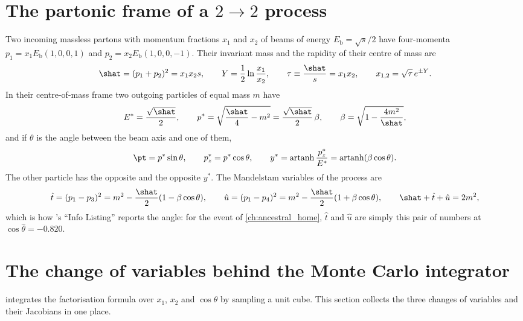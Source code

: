 \section{The partonic frame of a \texorpdfstring{$2\to2$}{2->2} process}
\label{app:kinematics:partonic}

Two incoming massless partons with momentum fractions $x_1$ and $x_2$ of
beams of energy $E_{\mathrm b}=\sqrt s/2$ have four-momenta
$p_1=x_1E_{\mathrm b}(1,0,0,1)$ and $p_2=x_2E_{\mathrm b}(1,0,0,-1)$. Their
invariant mass and the rapidity of their centre of mass are
\begin{equation}
  \shat=(p_1+p_2)^2=x_1x_2s,\qquad
  Y=\frac12\ln\frac{x_1}{x_2},\qquad
  \tau\equiv\frac{\shat}{s}=x_1x_2,\qquad
  x_{1,2}=\sqrt\tau\,e^{\pm Y}.
  \label{eq:app:tauY}
\end{equation}
In their centre-of-mass frame two outgoing particles of equal mass $m$ have
\begin{equation}
  E^{*}=\frac{\sqrt{\shat}}2,\qquad
  p^{*}=\sqrt{\frac{\shat}4-m^2}=\frac{\sqrt{\shat}}2\,\beta,\qquad
  \beta=\sqrt{1-\frac{4m^2}{\shat}},
  \label{eq:app:pstar}
\end{equation}
and if $\theta$ is the angle between the beam axis and one of them,
\begin{equation}
  \pt=p^{*}\sin\theta,\qquad
  p_z^{*}=p^{*}\cos\theta,\qquad
  y^{*}=\operatorname{artanh}\frac{p_z^{*}}{E^{*}}=\operatorname{artanh}(\beta\cos\theta).
  \label{eq:app:ystar}
\end{equation}
The other particle has the opposite \pt and the opposite $y^{*}$. The
Mandelstam variables of the process are
\begin{equation}
  \hat t=(p_1-p_3)^2=m^2-\frac{\shat}2(1-\beta\cos\theta),\qquad
  \hat u=(p_1-p_4)^2=m^2-\frac{\shat}2(1+\beta\cos\theta),\qquad
  \shat+\hat t+\hat u=2m^2,
\end{equation}
which is how \PYTHIA's ``Info Listing'' reports the angle: for the event of
\cref{ch:ancestral_home}, $\hat t$ and $\hat u$ are simply this pair of
numbers at $\cos\hat\theta=-0.820$.

\section{The change of variables behind the Monte Carlo integrator}
\label{app:kinematics:jacobian}

 integrates the factorisation formula over $x_1$,
$x_2$ and $\cos\theta$ by sampling a unit cube. This section collects the
three changes of variables and their Jacobians in one place.

